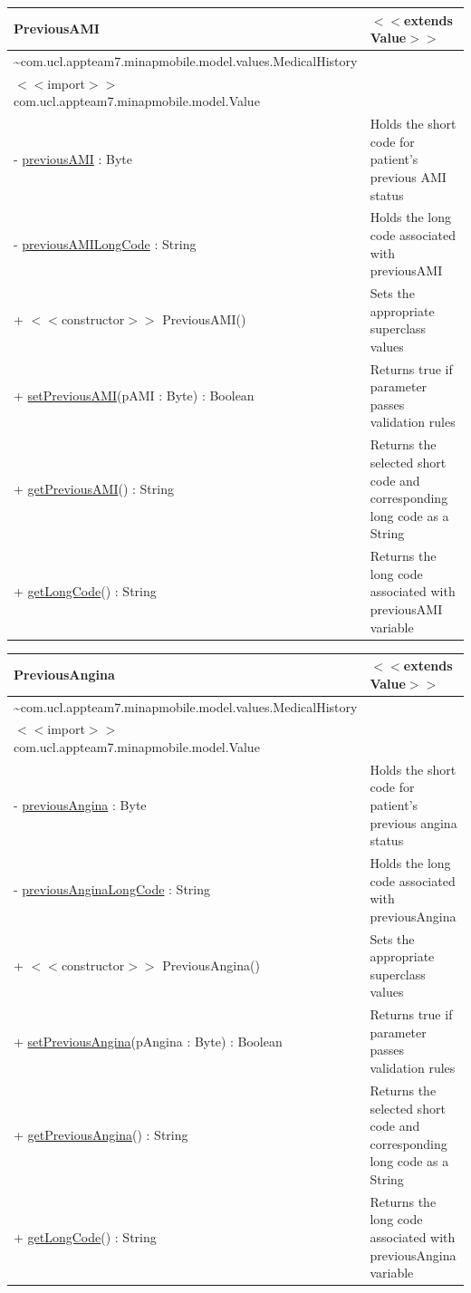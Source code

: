 \documentclass[12pt,a4paper,oneside,titlepage]{article}
\begin{document}
\begin{center}
	\begin{tabular}{| p{13cm} | p{5cm} |}
	\hline
	\textbf{PreviousAMI} & \textbf{$<<$extends Value$>>$} \\ \hline
	\textasciitilde com.ucl.appteam7.minapmobile.model.values.MedicalHistory	 & \\ \hline
$<<$import$>>$ com.ucl.appteam7.minapmobile.model.Value	& \\ \hline \hline
- \underline{previousAMI} : Byte	 & Holds the short code for patient's previous AMI status \\ \hline
- \underline{previousAMILongCode} : String	 & Holds the long code associated with previousAMI \\ \hline \hline
+ $<<$constructor$>>$ PreviousAMI()	 & Sets the appropriate superclass values \\ \hline
+ \underline{setPreviousAMI}(pAMI : Byte) : Boolean	 & Returns true if parameter passes validation rules \\ \hline
+ \underline{getPreviousAMI}() : String	 & Returns the selected short code and corresponding long code as a String \\ \hline
+ \underline{getLongCode}() : String	 & Returns the long code associated with previousAMI variable \\ \hline
	\end{tabular}
\end{center}

\begin{center}
	\begin{tabular}{| p{13cm} | p{5cm} |}
	\hline
	\textbf{PreviousAngina} & \textbf{$<<$extends Value$>>$} \\ \hline
	\textasciitilde com.ucl.appteam7.minapmobile.model.values.MedicalHistory	 & \\ \hline
$<<$import$>>$ com.ucl.appteam7.minapmobile.model.Value	 & \\ \hline \hline
- \underline{previousAngina} : Byte	 & Holds the short code for patient's previous angina status \\ \hline
- \underline{previousAnginaLongCode} : String	 & Holds the long code associated with previousAngina \\ \hline \hline
+ $<<$constructor$>>$ PreviousAngina()	 & Sets the appropriate superclass values \\ \hline
+ \underline{setPreviousAngina}(pAngina : Byte) : Boolean	 & Returns true if parameter passes validation rules \\ \hline
+ \underline{getPreviousAngina}() : String	 & Returns the selected short code and corresponding long code as a String \\ \hline
+ \underline{getLongCode}() : String	 & Returns the long code associated with previousAngina variable \\ \hline
	\end{tabular}
\end{center}
\end{document}

